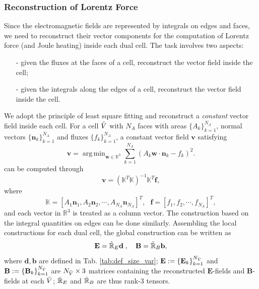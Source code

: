 \documentclass{article}
\DeclareMathOperator*{\argmin}{arg\,min}
\begin{document}
\subsubsection{Reconstruction of Lorentz Force}

Since the electromagnetic fields are represented by integrals on edges and faces, we need
to reconstruct their vector components for the computation of Lorentz force (and Joule
heating) inside each dual cell. The task involves two aspects:
\begin{itemize}
    \item[-] given the fluxes at the faces of a cell, reconstruct the vector field inside the cell;
    \item[-] given the integrals along the edges of a cell, reconstruct the vector field inside the cell. 
\end{itemize}
We adopt the principle of least square fitting and reconstruct a \emph{constant} vector
field inside each cell. For a cell $\Tilde{V}$ with $N_A$ faces with areas
$\{A_k\}_{k=1}^{N_A}$, normal vectors $\{\mathbf{n}_k\}_{k=1}^{N_A}$ and fluxes
$\{f_k\}_{k=1}^{N_A}$, a constant vector field $\mathbf{v}$ satisfying
\begin{equation*}
    \mathbf{v} = \argmin_{\mathbf{w}\in \mathbb{R}^3} \sum_{k=1}^{N_A}(A_k\mathbf{w} \cdot \mathbf{n}_k - f_k)^2.   
\end{equation*} can be computed through
\begin{equation*}
    \mathbf{v} = (\mathbb{K}^T\mathbb{K})^{-1}\mathbb{K}^T\mathbf{f},
\end{equation*}
where
\begin{equation*}
    \mathbb{K} = [A_1\mathbf{n}_1, A_2\mathbf{n}_2, \cdots, A_{N_A}\mathbf{n}_{N_A}]^T,\ \ \ \mathbf{f} = [f_1, f_2, \cdots, f_{N_A}]^T,
\end{equation*}
and each vector in $\mathbb{R}^3$ is treated as a column vector. The construction based on
the integral quantities on edges can be done similarly. Assembling the local constructions
for each dual cell, the global construction can be written as
\begin{equation}
    \mathbf{E} = \Tilde{\mathbb{R}}_E\mathbf{d}\;,
    \quad
    \mathbf{B} = \Tilde{\mathbb{R}}_B\mathbf{b},
    \label{equ:reconstruction}
\end{equation}
where $\mathbf{d}, \mathbf{b}$ are defined in Tab. \ref{tab:def_size_var};
$\mathbf{E} := \{\mathbf{E}_k\}_{k=1}^{N_{\Tilde{V}}}$ and
$\mathbf{B} := \{\mathbf{B}_k\}_{k=1}^{N_{\Tilde{V}}}$ are $N_{\Tilde{V}} \times 3$
matrices containing the reconstructed $\mathbf{E}$-fields and $\mathbf{B}$-fields at each
$\Tilde{V}$; $\Tilde{\mathbb{R}}_E$ and $\Tilde{\mathbb{R}}_B$ are thus rank-3 tensors.
\end{document}
